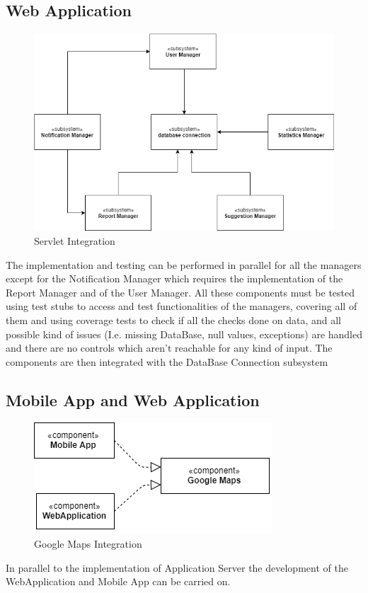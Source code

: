 \subsection{Web Application}
\begin{figure}[H]
\centering
\includegraphics[width=\textwidth]{Images/TestServlet.png}
\caption{\label{fig:ComWI}Servlet Integration}
\end{figure}
The implementation and testing can be performed in parallel for all the managers except for the Notification Manager which requires the implementation of the Report Manager and of the User Manager. All these components must be tested using test stubs to access and test functionalities of the managers, covering all of them and using coverage tests to check if all the checks done on data, and all possible kind of issues (I.e. missing DataBase, null values, exceptions) are handled and there are no controls which aren’t reachable for any kind of input. The components are then integrated with the DataBase Connection subsystem
\subsection{Mobile App and Web Application}
\begin{figure}[H]
\centering
\includegraphics{Images/IntegrationMaps.png}
\caption{\label{fig:ComWI}Google Maps Integration}
\end{figure}
In parallel to the implementation of Application Server the development of the WebApplication and
Mobile App can be carried on.

